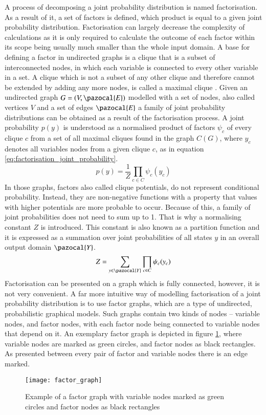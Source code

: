 A process of decomposing a joint probability distribution is named factorisation. As a result of it, a set of factors is defined, which product is equal to a given joint probability distribution. Factorisation can largely decrease the complexity of calculations as it is only required to calculate the outcome of each factor within its scope being usually much smaller than the whole input domain. A base for defining a factor in undirected graphs is a clique that is a subset of interconnected nodes, in which each variable is connected to every other variable in a set. A clique which is not a subset of any other clique and therefore cannot be extended by adding any more nodes, is called a maximal clique \cite{clique}. Given an undirected graph $G=(V,\pazocal{E})$ modelled with a set of nodes, also called vertices $V$ and a set of edges $\pazocal{E}$ a family of joint probability distributions can be obtained as a result of the factorisation process. A joint probability $p(y)$ is understood as a normalised product of factors $\psi_{c}$ of every clique $c$ from a set of all maximal cliques found in the graph $C(G)$, where $y_c$ denotes all variables nodes from a given clique $c$, as in equation \ref{eq:factorisation_joint_probability}.
\begin{equation}
    \label{eq:factorisation_joint_probability}
    p(y)=\frac{1}{Z}\prod_{c\in C}\psi_{c}({y_c})
\end{equation}
In those graphs, factors also called clique potentials, do not represent conditional probability. Instead, they are non-negative functions with a property that values with higher potentials are more probable to occur. Because of this, a family of joint probabilities does not need to sum up to 1. That is why a normalising constant $Z$ is introduced. This constant is also known as a partition function and it is expressed as a summation over joint probabilities of all states $y$ in an overall output domain $\pazocal{Y}$.
\begin{equation}
    Z=\sum_{y\in \pazocal{Y}}\prod_{c\in C}\psi_{c}({y_c}) 
\end{equation}
Factorisation can be presented on a graph which is fully connected, however, it is not very convenient. A far more intuitive way of modelling factorisation of a joint probability distribution is to use factor graphs, which are a type of undirected, probabilistic graphical models. Such graphs contain two kinds of nodes – variable nodes, and factor nodes, with each factor node being connected to variable nodes that depend on it. An exemplary factor graph is depicted in figure \ref{fig:factor_graph}, where variable nodes are marked as green circles, and factor nodes as black rectangles. As presented between every pair of factor and variable nodes there is an edge marked.
\begin{figure}[ht]
    \centering
    \texttt{[image: factor\_graph]}
    \caption{Example of a factor graph with variable nodes marked as green circles and factor nodes as black rectangles}
     \label{fig:factor_graph}
\end{figure}

